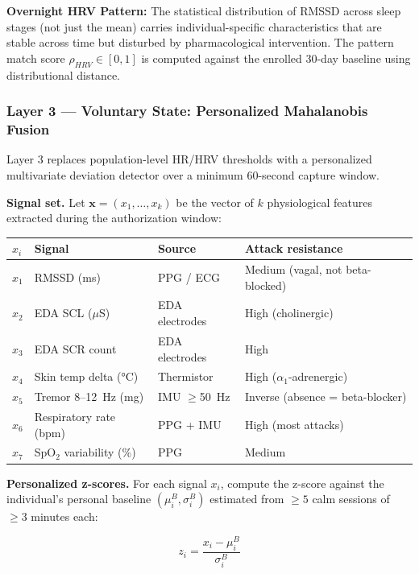 \documentclass[12pt,a4paper]{article}
\begin{document}
\textbf{Overnight HRV Pattern:} The statistical distribution of RMSSD across
sleep stages (not just the mean) carries individual-specific characteristics
that are stable across time but disturbed by pharmacological intervention.
The pattern match score $\rho_{HRV} \in [0, 1]$ is computed against the
enrolled 30-day baseline using distributional distance.

\subsubsection{Layer 3 — Voluntary State: Personalized Mahalanobis Fusion}
\label{sec:fusion}

Layer 3 replaces population-level HR/HRV thresholds with a personalized
multivariate deviation detector over a minimum 60-second capture window.

\textbf{Signal set.} Let $\mathbf{x} = (x_1, \ldots, x_k)$ be the vector of
$k$ physiological features extracted during the authorization window:

\begin{center}
\begin{tabular}{llll}
\toprule
$x_i$ & Signal & Source & Attack resistance \\
\midrule
$x_1$ & RMSSD (ms) & PPG / ECG & Medium (vagal, not beta-blocked) \\
$x_2$ & EDA SCL ($\mu$S) & EDA electrodes & High (cholinergic) \\
$x_3$ & EDA SCR count & EDA electrodes & High \\
$x_4$ & Skin temp delta (°C) & Thermistor & High ($\alpha_1$-adrenergic) \\
$x_5$ & Tremor 8--12~Hz (mg) & IMU $\geq$50~Hz & Inverse (absence = beta-blocker) \\
$x_6$ & Respiratory rate (bpm) & PPG + IMU & High (most attacks) \\
$x_7$ & SpO$_2$ variability (\%) & PPG & Medium \\
\bottomrule
\end{tabular}
\end{center}

\textbf{Personalized z-scores.} For each signal $x_i$, compute the z-score
against the individual's personal baseline $(\mu_i^B, \sigma_i^B)$ estimated
from $\geq 5$ calm sessions of $\geq 3$ minutes each:

\begin{equation}
z_i = \frac{x_i - \mu_i^B}{\sigma_i^B}
\end{equation}
\end{document}
